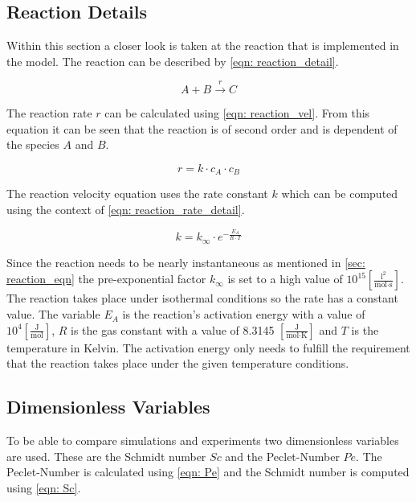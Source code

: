 \documentclass[../thesis.tex]{subfiles}
\begin{document}
\subsection{Reaction Details}
\label{sec: reaction_details}

Within this section a closer look is taken at the reaction that is implemented in the model. The reaction can be described by \autoref{eqn: reaction_detail}.

\begin{equation}
	\label{eqn: reaction_detail}
	A + B \xrightarrow{r} C
\end{equation}

The reaction rate $r$ can be calculated using \autoref{eqn: reaction_vel}. From this equation it can be seen that the reaction is of second order and is dependent of the species $A$ and $B$.

\begin{equation}
	\label{eqn: reaction_vel}
	r = k \cdot c_A \cdot c_B
\end{equation}

The reaction velocity equation uses the rate constant $k$ which can be computed using the context of \autoref{eqn: reaction_rate_detail}.

\begin{equation}
	\label{eqn: reaction_rate_detail}
	k = k_{\infty} \cdot e^{- \frac{E_A}{R \cdot T}}
\end{equation}

Since the reaction needs to be nearly instantaneous as mentioned in \autoref{sec: reaction_eqn} the pre-exponential factor $k_{\infty}$ is set to a high value of $10^{15} \left[ \frac{\text{l}^2}{\text{mol} \cdot \text{s}} \right] $. The reaction takes place under isothermal conditions so the rate has a constant value. The variable $E_A$ is the reaction's activation energy with a value of $10^4 \left[ \frac{\text{J}}{\text{mol}} \right] $, $R$ is the gas constant with a value of 8.3145 $\left[ \frac{\text{J}}{\text{mol} \cdot \text{K}} \right] $ and $T$ is the temperature in Kelvin. The activation energy only needs to fulfill the requirement that the reaction takes place under the given temperature conditions.

\subsection{Dimensionless Variables}

To be able to compare simulations and experiments two dimensionless variables are used. These are the Schmidt number $Sc$ and the Peclet-Number $Pe$. The Peclet-Number is calculated using \autoref{eqn: Pe} and the Schmidt number is computed using \autoref{eqn: Sc}.
\end{document}
